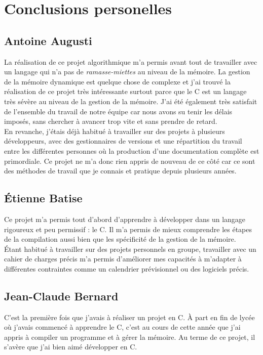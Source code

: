 \chapter{Conclusions personelles}
\minitoc
	\section{Antoine Augusti}
	La réalisation de ce projet algorithmique m'a permis avant tout de travailler avec un langage qui n'a pas de \textit{ramasse-miettes} au niveau de la mémoire. La gestion de la mémoire dynamique est quelque chose de complexe et j'ai trouvé la réalisation de ce projet très intéressante surtout parce que le C est un langage très sévère au niveau de la gestion de la mémoire. J'ai été également très satisfait de l'ensemble du travail de notre équipe car nous avons su tenir les délais imposés, sans chercher à avancer trop vite et sans prendre de retard.\\

	En revanche, j'étais déjà habitué à travailler sur des projets à plusieurs développeurs, avec des gestionnaires de versions et une répartition du travail entre les différentes personnes où la production d'une documentation complète est primordiale. Ce projet ne m'a donc rien appris de nouveau de ce côté car ce sont des méthodes de travail que je connais et pratique depuis plusieurs années.

	\section{Étienne Batise}
	Ce projet m'a permis tout d'abord d'apprendre à développer dans un langage rigoureux et peu permissif : le C. Il m'a permis de mieux comprendre les étapes de la compilation aussi bien que les spécificité de la gestion de la mémoire.\\

	Étant habitué à travailler sur des projets personnels en groupe, travailler avec un cahier de charges précis m'a permis d'améliorer mes capacités à m'adapter à différentes contraintes comme un calendrier prévisionnel ou des logiciels précis.

	\section{Jean-Claude Bernard}
	C'est la première fois que j'avais à réaliser un projet en C. À part en fin de lycée où j'avais commencé à apprendre le C, c'est au cours de cette année que 
	j'ai appris à compiler un programme et à gérer la mémoire. Au terme de ce projet, il s'avère que j'ai bien aimé développer en C.\\
	
